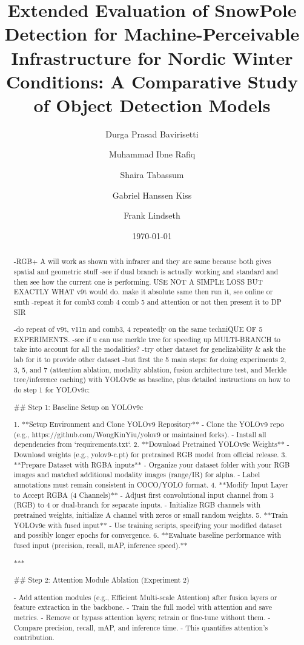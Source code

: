 \documentclass[runningheads]{llncs}
\title{Extended Evaluation of SnowPole Detection for Machine-Perceivable Infrastructure for Nordic Winter Conditions: A Comparative Study of Object Detection Models}
\date{\today}
\author{
Durga Prasad Bavirisetti\inst{1,2} \and
Muhammad Ibne Rafiq\inst{3} \and
Shaira Tabassum\inst{1} \and
Gabriel Hanssen Kiss\inst{1} \and
Frank Lindseth\inst{1}
}
\institute{
Dept. of Computer Science, NTNU, Trondheim, Norway \and
Dept. of Computer Science, University of Gävle, Gävle, Sweden \and
Dept. of Mathematics and Computer Science, Eindhoven University of Technology, Netherlands \\
\email{durga.prasad.bavirisetti@hig.se} \\
}
\begin{document}
\maketitle
\begin{abstract}
-RGB+ A will work as shown with infrarer and they are same because both gives spatial and geometric stuff
-see if dual branch is actually working and standard and then see how the current one is performing. USE NOT A SIMPLE LOSS BUT EXACTLY WHAT v9t would do. make it absolute same then run it, see online or smth
-repeat it for comb3 comb 4 comb 5 and attention or not then present it to DP SIR


-do repeat of v9t, v11n and comb3, 4 repeatedly on the same techniQUE OF 5 EXPERIMENTS.
-see if u can use merkle tree for speeding up MULTI-BRANCH to take into account for all the modalities?
-try other dataset for genelizability & ask the lab for it to provide other dataset
-but first the 5 main steps:
for doing experiments 2, 3, 5, and 7 (attention ablation, modality ablation, fusion architecture test, and Merkle tree/inference caching) with YOLOv9c as baseline, plus detailed instructions on how to do step 1 for YOLOv9c:

## Step 1: Baseline Setup on YOLOv9c

1. **Setup Environment and Clone YOLOv9 Repository**
   - Clone the YOLOv9 repo (e.g., https://github.com/WongKinYiu/yolov9 or maintained forks).
   - Install all dependencies from `requirements.txt`.
2. **Download Pretrained YOLOv9c Weights**
   - Download weights (e.g., yolov9-c.pt) for pretrained RGB model from official release.
3. **Prepare Dataset with RGBA inputs**
   - Organize your dataset folder with your RGB images and matched additional modality images (range/IR) for alpha.
   - Label annotations must remain consistent in COCO/YOLO format.
4. **Modify Input Layer to Accept RGBA (4 Channels)**
   - Adjust first convolutional input channel from 3 (RGB) to 4 or dual-branch for separate inputs.
   - Initialize RGB channels with pretrained weights, initialize A channel with zeros or small random weights.
5. **Train YOLOv9c with fused input**
   - Use training scripts, specifying your modified dataset and possibly longer epochs for convergence.
6. **Evaluate baseline performance with fused input (precision, recall, mAP, inference speed).**

***

## Step 2: Attention Module Ablation (Experiment 2)

- Add attention modules (e.g., Efficient Multi-scale Attention) after fusion layers or feature extraction in the backbone.
- Train the full model with attention and save metrics.
- Remove or bypass attention layers; retrain or fine-tune without them.
- Compare precision, recall, mAP, and inference time.
- This quantifies attention's contribution.


\end{abstract}
\end{document}
